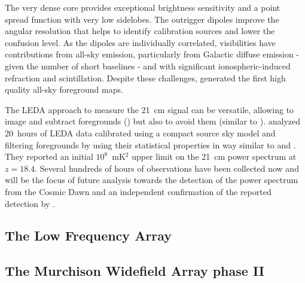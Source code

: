 The very dense core provides exceptional brightness sensitivity and a point spread function with very low sidelobes. The outrigger dipoles improve the angular resolution that helps to identify calibration sources and lower the confusion level. As the dipoles are individually correlated, visibilities have contributions from all-sky emission, particularly from Galactic diffuse emission - given the number of short baselines - and with significant ionospheric-induced refraction and scintillation. Despite these challenges, \cite{eastwood18} generated the first high quality all-sky foreground maps. 

The LEDA approach to measure the 21~cm signal can be versatile, allowing to image and subtract foregrounds (\cite{eastwood18}) but also to avoid them (similar to \cite{beardsley16}). \cite{eastwood19} analyzed 20~hours of LEDA data calibrated using a compact source sky model and filtering foregrounds by using their statistical properties in way similar to \cite{dillon14} and \cite{trott16}. They reported an initial $10^8$~mK$^2$ upper limit on the 21~cm power spectrum at $z = 18.4$. Several hundreds of hours of observations have been collected now and will be the focus of future analysis towards the detection of the power spectrum from the Cosmic Dawn and an independent confirmation of the reported detection by \cite{bowman18}.



\subsection{The Low Frequency Array}
\label{section:lofar}



\subsection{The Murchison Widefield Array phase II}

